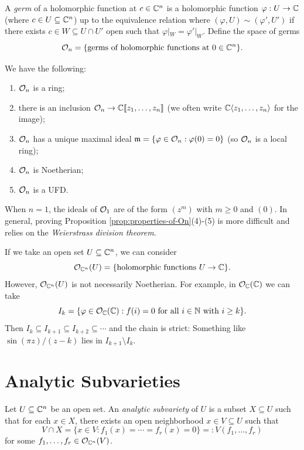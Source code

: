 \begin{definition}
  A \emph{germ} of a holomorphic function
  at $c \in \mathbb{C}^n$ is a holomorphic
  function $\varphi : U \to \mathbb{C}$ (where
  $c \in U \subseteq \mathbb{C}^n$)
  up to the equivalence relation
  where $(\varphi, U) \sim (\varphi', U')$
  if there exists
  $c \in W \subseteq U \cap U'$ open such
  that $\varphi|_W = \varphi'|_W$. Define
  the space of germs
  \[
    \mathcal{O}_n
    = \{
      \text{germs of holomorphic functions at $0 \in \mathbb{C}^n$}
    \}.
  \]
\end{definition}

\begin{prop}\label{prop:properties-of-On}
  We have the following:
  \begin{enumerate}
    \item $\mathcal{O}_n$ is a ring;
    \item there is an inclusion
      $\mathcal{O}_n \to \mathbb{C} \llbracket z_1, \dots, z_n \rrbracket$
      (we often write $\mathbb{C} \langle z_1, \dots, z_n \rangle$ for the image);
    \item $\mathcal{O}_n$ has a unique
      maximal ideal
      $\mathfrak{m} = \{\varphi \in \mathcal{O}_n : \varphi(0) = 0\}$
      (so $\mathcal{O}_n$ is a local ring);
    \item $\mathcal{O}_n$ is Noetherian;
    \item $\mathcal{O}_n$ is a UFD.
  \end{enumerate}
\end{prop}

\begin{remark}
  When $n = 1$, the ideals of $\mathcal{O}_1$
  are of the form $(z^m)$ with $m \ge 0$
  and $(0)$. In general, proving
  Proposition \ref{prop:properties-of-On}(4)-(5)
  is more difficult and relies on the
  \emph{Weierstrass division theorem}.
\end{remark}

\begin{remark}
  If we take an open set $U \subseteq \mathbb{C}^n$,
  we can consider
  \[
    \mathcal{O}_{\mathbb{C}^n}(U)
    = \{\text{holomorphic functions $U \to \mathbb{C}$}\}.
  \]
  However, $\mathcal{O}_{\mathbb{C}^n}(U)$ is not
  necessarily Noetherian. For example,
  in $\mathcal{O}_{\mathbb{C}}(\mathbb{C})$ we can take
  \[
    I_k = \{
      \varphi \in \mathcal{O}_{\mathbb{C}}(\mathbb{C})
      : f(i) = 0 \text{ for all } i \in \mathbb{N}
      \text{ with } i \ge k
    \}.
  \]
  Then $I_k \subseteq I_{k + 1} \subseteq I_{k + 2} \subseteq \cdots$
  and the chain is strict: Something like
  $\sin(\pi z) / (z - k)$ lies in
  $I_{k + 1} \setminus I_k$.
\end{remark}

\section{Analytic Subvarieties}
\begin{definition}
  Let $U \subseteq \mathbb{C}^n$ be an open
  set. An \emph{analytic subvariety}
  of $U$ is a subset $X \subseteq U$ such
  that for each $x \in X$, there exists an
  open neighborhood $x \in V \subseteq U$
  such that
  \[
    V \cap X
    = \{x \in V : f_1(x) = \cdots = f_r(x) = 0\}
    =: V(f_1, \dots, f_r)
  \]
  for some $f_1, \dots, f_r \in \mathcal{O}_{\mathbb{C}^n}(V)$.
\end{definition}

